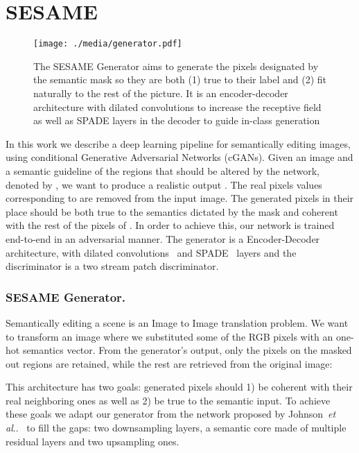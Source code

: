 \documentclass[runningheads]{llncs}
\makeatletter
\DeclareRobustCommand\onedot{\futurelet\@let@token\@onedot}
\def\@onedot{\ifx\@let@token.\else.\null\fi\xspace}
\def\etal{\emph{et al}\onedot}
\makeatother
\begin{document}
\section{SESAME}
\label{sec:proposed_approach}

\begin{figure}[t]
\begin{center}
    \centering
    \texttt{[image: ./media/generator.pdf]}
    \caption{The SESAME Generator aims to generate the pixels designated by the semantic mask so they are both (1) true to their label and (2) fit naturally to the rest of the picture.
    It is an encoder-decoder architecture with dilated convolutions to increase the receptive field as well as SPADE layers in the decoder to guide in-class generation}
    \label{fig:generator}
\end{center}
\end{figure}

In this work we describe a deep learning pipeline for semantically editing images, using conditional Generative Adversarial Networks (cGANs). 
 Given an image  and a semantic guideline of the regions that should be altered by the network, denoted by , we want to produce a realistic output . 
The real pixels values corresponding to  are removed from the input image. The generated pixels in their place should be both true to the semantics dictated by the mask and coherent with the rest of the pixels of .
In order to achieve this, our network is trained end-to-end in an adversarial manner. The generator is a Encoder-Decoder architecture, with dilated convolutions~\cite{Yu2016} and SPADE~\cite{park2019SPADE} layers and the discriminator is a two stream patch discriminator.

\subsubsection{SESAME Generator.} 
\label{ss:generator}

Semantically editing a scene is an Image to Image translation problem. 
We want to transform an image where we substituted some of the RGB pixels with an one-hot semantics vector. From the generator's output, only the pixels on the masked out regions are retained, while the rest are retrieved from the original image:



This architecture has two goals:  generated pixels should 1) be coherent with their real neighboring ones as well as 2) be true to the semantic input.
To achieve these goals we adapt our generator from the network proposed by Johnson~\etal~\cite{Johnson2016Perceptual} to fill the gaps: two downsampling layers, a semantic core made of multiple  residual layers and two upsampling ones. 
\end{document}
